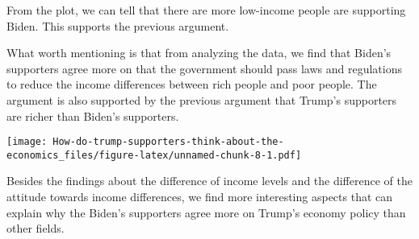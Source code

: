 \documentclass[
]{article}
\newenvironment{Shaded}{\begin{snugshade}}{\end{snugshade}}
\newcommand{\DataTypeTok}[1]{\textcolor[rgb]{0.13,0.29,0.53}{#1}}
\newcommand{\DecValTok}[1]{\textcolor[rgb]{0.00,0.00,0.81}{#1}}
\newcommand{\FloatTok}[1]{\textcolor[rgb]{0.00,0.00,0.81}{#1}}
\newcommand{\KeywordTok}[1]{\textcolor[rgb]{0.13,0.29,0.53}{\textbf{#1}}}
\newcommand{\NormalTok}[1]{#1}
\newcommand{\OperatorTok}[1]{\textcolor[rgb]{0.81,0.36,0.00}{\textbf{#1}}}
\newcommand{\StringTok}[1]{\textcolor[rgb]{0.31,0.60,0.02}{#1}}
\begin{document}
From the plot, we can tell that there are more low-income people are
supporting Biden. This supports the previous argument.

What worth mentioning is that from analyzing the data, we find that
Biden's supporters agree more on that the government should pass laws
and regulations to reduce the income differences between rich people and
poor people. The argument is also supported by the previous argument
that Trump's supporters are richer than Biden's supporters.

\begin{Shaded}
\end{Shaded}

\texttt{[image: How-do-trump-supporters-think-about-the-economics\_files/figure-latex/unnamed-chunk-8-1.pdf]}

Besides the findings about the difference of income levels and the
difference of the attitude towards income differences, we find more
interesting aspects that can explain why the Biden's supporters agree
more on Trump's economy policy than other fields.
\end{document}
